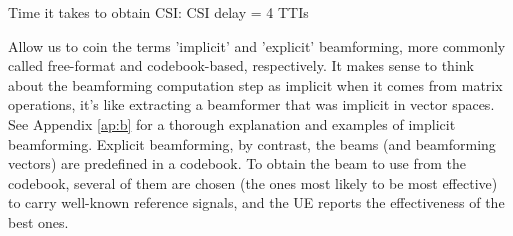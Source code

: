 








Time it takes to obtain CSI: CSI delay = 4 TTIs


Allow us to coin the terms 'implicit' and 'explicit' beamforming, more commonly called free-format and codebook-based, respectively. It makes sense to think about the beamforming computation step as implicit when it comes from matrix operations, it's like extracting a beamformer that was implicit in vector spaces. See Appendix \ref{ap:b} for a thorough explanation and examples of implicit beamforming. Explicit beamforming, by contrast, the beams (and beamforming vectors) are predefined in a codebook. To obtain the beam to use from the codebook, several of them are chosen (the ones most likely to be most effective) to carry well-known reference signals, and the UE reports the effectiveness of the best ones.

